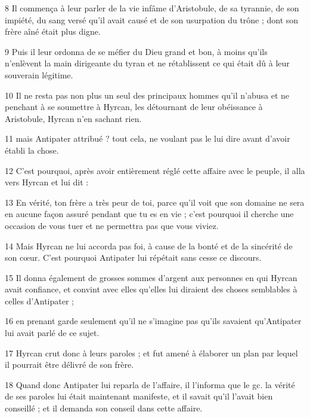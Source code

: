 \par 8 Il commença à leur parler de la vie infâme d'Aristobule, de sa tyrannie, de son impiété, du sang versé qu'il avait causé et de son usurpation du trône ; dont son frère aîné était plus digne.

\par 9 Puis il leur ordonna de se méfier du Dieu grand et bon, à moins qu'ils n'enlèvent la main dirigeante du tyran et ne rétablissent ce qui était dû à leur souverain légitime.

\par 10 Il ne resta pas non plus un seul des principaux hommes qu'il n'abusa et ne penchant à se soumettre à Hyrcan, les détournant de leur obéissance à Aristobule, Hyrcan n'en sachant rien.

\par 11 mais Antipater attribué ? tout cela, ne voulant pas le lui dire avant d'avoir établi la chose.

\par 12 C'est pourquoi, après avoir entièrement réglé cette affaire avec le peuple, il alla vers Hyrcan et lui dit :

\par 13 En vérité, ton frère a très peur de toi, parce qu'il voit que son domaine ne sera en aucune façon assuré pendant que tu es en vie ; c'est pourquoi il cherche une occasion de vous tuer et ne permettra pas que vous viviez.

\par 14 Mais Hyrcan ne lui accorda pas foi, à cause de la bonté et de la sincérité de son cœur. C'est pourquoi Antipater lui répétait sans cesse ce discours.

\par 15 Il donna également de grosses sommes d'argent aux personnes en qui Hyrcan avait confiance, et convint avec elles qu'elles lui diraient des choses semblables à celles d'Antipater ;

\par 16 en prenant garde seulement qu'il ne s'imagine pas qu'ils savaient qu'Antipater lui avait parlé de ce sujet.

\par 17 Hyrcan crut donc à leurs paroles ; et fut amené à élaborer un plan par lequel il pourrait être délivré de son frère.

\par 18 Quand donc Antipater lui reparla de l'affaire, il l'informa que le gc. la vérité de ses paroles lui était maintenant manifeste, et il savait qu'il l'avait bien conseillé ; et il demanda son conseil dans cette affaire.

